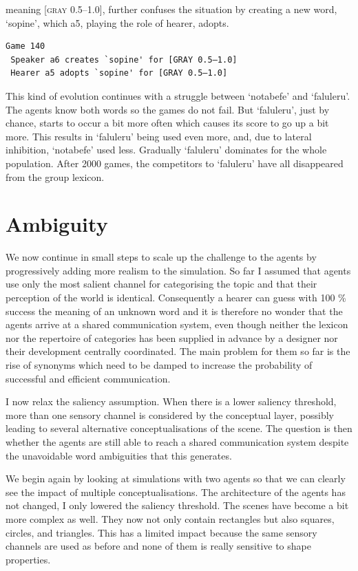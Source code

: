 meaning [\textsc{gray} 0.5–1.0], further confuses the situation by 
creating a new word, `sopine', which {\bfshape  a5}, playing
the role of hearer, adopts. 
\begin{verbatim}
Game 140
 Speaker a6 creates `sopine' for [GRAY 0.5–1.0]
 Hearer a5 adopts `sopine' for [GRAY 0.5–1.0]
\end{verbatim}
This kind of evolution continues with a struggle between 
`notabefe' and `faluleru'. The agents know both 
words so the games do not fail. But `faluleru', 
just by chance, starts to occur a bit more often
which causes its score to go up a bit more. 
This results in `faluleru' being used even more, 
and, due to lateral inhibition, `notabefe' used 
less. Gradually `faluleru' dominates for 
the whole population. 
After 2000 games, the competitors to `faluleru' have 
all disappeared from the group lexicon. 

\section{Ambiguity} 

We now continue in small steps to scale up the
challenge to the agents by progressively 
adding more realism to the simulation. So far I 
assumed that agents use only 
the most salient channel for categorising the topic
and that their perception of the world is identical.
Consequently a hearer can guess with 100 \% success the
meaning of an unknown word and 
it is therefore no wonder that the agents arrive at a 
shared communication system, 
even though neither the lexicon nor the repertoire
of categories has been supplied in advance by a 
designer nor their development centrally
coordinated. The main problem for them so far is 
the rise of synonyms which need to be damped to 
increase the probability of successful and 
efficient communication. 

I now relax the saliency assumption. When 
there is a lower saliency threshold, more than one
sensory channel is considered by the conceptual 
layer, possibly leading to several alternative
conceptualisations of the scene. The question is 
then whether the agents are still able to reach 
a shared communication system despite the unavoidable
word ambiguities that this generates. 

We begin again by looking at simulations
with two agents so that we 
can clearly see the impact of multiple conceptualisations. 
The architecture of the agents has not changed, I only 
lowered the saliency threshold. 
The scenes have become a bit more complex as well. They 
now not only contain rectangles but also squares, circles, 
and triangles. This has a limited impact because the 
same sensory channels are used as before and none of them 
is really sensitive to shape properties. 


